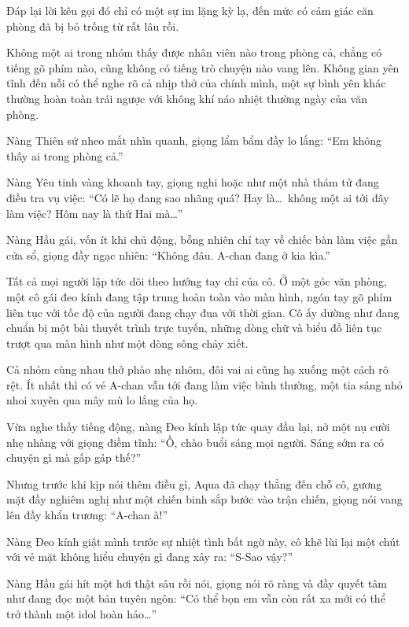\documentclass[../main.tex]{subfiles}
\begin{document}

Đáp lại lời kêu gọi đó chỉ có một sự im lặng kỳ lạ, đến mức có cảm giác căn phòng đã bị bỏ trống từ rất lâu rồi.

Không một ai trong nhóm thấy được nhân viên nào trong phòng cả, chẳng có tiếng gõ phím nào, cũng không có tiếng trò chuyện nào vang lên. Không gian yên tĩnh đến nỗi có thể nghe rõ cả nhịp thở của chính mình, một sự bình yên khác thường hoàn toàn trái ngược với không khí náo nhiệt thường ngày của văn phòng.

Nàng Thiên sứ nheo mắt nhìn quanh, giọng lẩm bẩm đầy lo lắng: ``Em không thấy ai trong phòng cả.''

Nàng Yêu tinh vàng khoanh tay, giọng nghi hoặc như một nhà thám tử đang điều tra vụ việc: ``Có lẽ họ đang sao nhãng quá? Hay là\dots\ không một ai tới đây làm việc? Hôm nay là thứ Hai mà\dots''

Nàng Hầu gái, vốn ít khi chủ động, bỗng nhiên chỉ tay về chiếc bàn làm việc gần cửa sổ, giọng đầy ngạc nhiên: ``Không đâu. A-chan đang ở kia kìa.''

Tất cả mọi người lập tức dõi theo hướng tay chỉ của cô. Ở một góc văn phòng, một cô gái đeo kính đang tập trung hoàn toàn vào màn hình, ngón tay gõ phím liên tục với tốc độ của người đang chạy đua với thời gian. Cô ấy dường như đang chuẩn bị một bài thuyết trình trực tuyến, những dòng chữ và biểu đồ liên tục trượt qua màn hình như một dòng sông chảy xiết.


Cả nhóm cùng nhau thở phào nhẹ nhõm, đôi vai ai cũng hạ xuống một cách rõ rệt. Ít nhất thì có vẻ A-chan vẫn tới đang làm việc bình thường, một tia sáng nhỏ nhoi xuyên qua mây mù lo lắng của họ.

Vừa nghe thấy tiếng động, nàng Đeo kính lập tức quay đầu lại, nở một nụ cười nhẹ nhàng với giọng điềm tĩnh: ``Ồ, chào buổi sáng mọi người. Sáng sớm ra có chuyện gì mà gấp gáp thế?''

Nhưng trước khi kịp nói thêm điều gì, Aqua đã chạy thẳng đến chỗ cô, gương mặt đầy nghiêm nghị như một chiến binh sắp bước vào trận chiến, giọng nói vang lên đầy khẩn trương: ``A-chan à!''

Nàng Đeo kính giật mình trước sự nhiệt tình bất ngờ này, cô khẽ lùi lại một chút với vẻ mặt không hiểu chuyện gì đang xảy ra: ``S-Sao vậy?''

Nàng Hầu gái hít một hơi thật sâu rồi nói, giọng nói rõ ràng và đầy quyết tâm như đang đọc một bản tuyên ngôn: ``Có thể bọn em vẫn còn rất xa mới có thể trở thành một idol hoàn hảo\dots''
\end{document}

